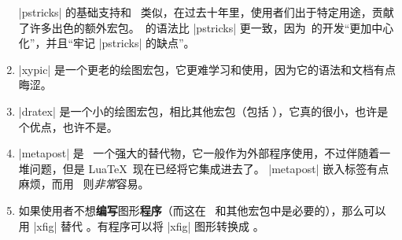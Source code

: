 \begin{onehalfspacing}
\begin{enumerate}
|pstricks| 的基础支持和 \tikzname\ 类似，在过去十年里，使用者们出于特定用途，贡献了许多出色的额外宏包。\tikzname\ 的语法比 |pstricks| 更一致，因为\tikzname\ 的开发“更加中心化”，并且“牢记 |pstricks| 的缺点”。
\item
|xypic| 是一个更老的绘图宏包，它更难学习和使用，因为它的语法和文档有点晦涩。
\item
|dratex| 是一个小的绘图宏包，相比其他宏包（包括 \tikzname），它真的很小，也许是个优点，也许不是。
\item
|metapost| 是 \tikzname\ 一个强大的替代物，它一般作为外部程序使用，不过伴随着一堆问题，但是 Lua\TeX\ 现在已经将它集成进去了。
|metapost| 嵌入标签有点麻烦，而用 \pgfname\ 则\emph{非常}容易。
\item
如果使用者不想\textbf{编写}图形\textbf{程序}（而这在 \tikzname\ 和其他宏包中是必要的），那么可以用 |xfig| 替代 \tikzname。有程序可以将 |xfig| 图形转换成 \tikzname。
\end{enumerate}

\end{onehalfspacing}

